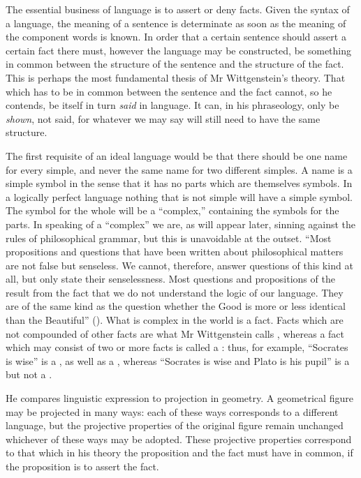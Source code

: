The essential business of language is to assert or
deny facts. Given the syntax of a language, the meaning
of a sentence is determinate as soon as the meaning of
the component words is known. In order that a certain
sentence should assert a certain fact there must, however
the language may be constructed, be something in common
between the structure of the sentence and the structure of
the fact. This is perhaps the most fundamental thesis
of Mr Wittgenstein's theory. That which has to be in
common between the sentence and the fact cannot, so
he contends, be itself in turn \emph{said} in language. It can,
in his phraseology, only be \emph{shown}, not said, for whatever
we may say will still need to have the same structure.

The first requisite of an ideal language would be that
there should be one name for every simple, and never the
same name for two different simples. A name is a simple
symbol in the sense that it has no parts which are themselves
symbols. In a logically perfect language nothing
that is not simple will have a simple symbol. The symbol
for the whole will be a ``complex,'' containing the symbols
for the parts. In speaking of a ``complex'' we are, as
will appear later, sinning against the rules of philosophical
grammar, but this is unavoidable at the outset. ``Most
propositions and questions that have been written about
philosophical matters are not false but senseless. We
cannot, therefore, answer questions of this kind at all,
but only state their senselessness. Most questions and
propositions of the  result from the fact that
we do not understand the logic of our language. They
are of the same kind as the question whether the Good is
more or less identical than the Beautiful'' (). What
is complex in the world is a fact. Facts which are not
compounded of other facts are what Mr Wittgenstein calls
, whereas a fact which may consist of two
or more facts is called a : thus, for example,
``Socrates is wise'' is a , as well as a ,
whereas ``Socrates is wise and Plato is his pupil'' is a
 but not a .

He compares linguistic expression to projection in
geometry. A geometrical figure may be projected in
many ways: each of these ways corresponds to a different
language, but the projective properties of the original
figure remain unchanged whichever of these ways may
be adopted. These projective properties correspond to
that which in his theory the proposition and the fact
must have in common, if the proposition is to assert the
fact.


